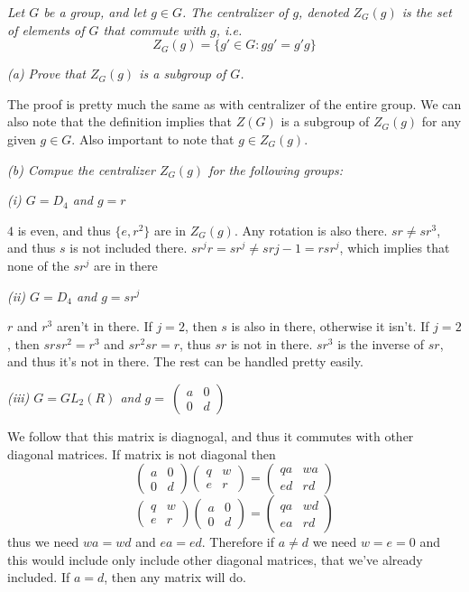 \documentclass[11pt,oneside,titlepage]{book}
\newcommand{\set}[1]{\{ #1 \}}
\begin{document}
\textit{Let $G$ be a group, and let $g \in G$. The centralizer of $g$,
  denoted $Z_G(g)$ is the set of elements of $G$ that commute with $g$,
  i.e.
  $$Z_G(g) = \set{g' \in G: gg' = g'g}$$
}

\textit{(a) Prove that $Z_G(g)$ is a subgroup of $G$.}

The proof is pretty much the same as with centralizer of the entire
group. We can also note that the definition implies that $Z(G)$ is a
subgroup of $Z_G(g)$ for any given $g \in G$. Also important to note
that $g \in Z_G(g)$.

\textit{(b) Compue the centralizer $Z_G(g)$ for the following groups:}

\textit{(i) $G = D_4$ and $g = r$}

$4$ is even, and thus $\set{e, r^2}$ are in $Z_G(g)$. Any rotation is
also there.  $sr \neq sr^3$, and thus $s$ is not included there. $sr^j
r = sr^j \neq sr{j - 1} = r sr^j$, which implies that none of the
$sr^j$ are in there

\textit{(ii) $G = D_4$ and $g = sr^j$}

$r$ and $r^3$ aren't in there. If $j = 2$, then $s$ is also in there,
otherwise it isn't.  If $j = 2$, then $sr sr^2 = r^{3}$ and $sr^2 sr =
r$, thus $sr$ is not in there.  $sr^3$ is the inverse of $sr$, and
thus it's not in there. The rest can be handled pretty easily.

\textit{(iii) $G = GL_2(R)$ and $g = \
  \begin{pmatrix}
    a & 0 \\
    0 & d
  \end{pmatrix}
  $
}

We follow that this matrix is diagnogal, and thus it commutes with other
diagonal matrices. If matrix is not diagonal then
$$
  \begin{pmatrix}
    a & 0 \\
    0 & d
  \end{pmatrix}
  \begin{pmatrix}
    q & w \\
    e & r
  \end{pmatrix} =
  \begin{pmatrix}
    qa & wa \\
    ed & rd
  \end{pmatrix}
  $$
  $$
  \begin{pmatrix}
    q & w \\
    e & r
  \end{pmatrix}
  \begin{pmatrix}
    a & 0 \\
    0 & d
  \end{pmatrix} =
  \begin{pmatrix}
    qa & wd \\
    ea & rd
  \end{pmatrix}
  $$
  thus we need $wa = wd$ and $ea = ed$. Therefore if $a \neq d$ we
need $w = e = 0$ and this would include only include other diagonal
matrices, that we've already included. If $a = d$, then any matrix
will do.
\end{document}
